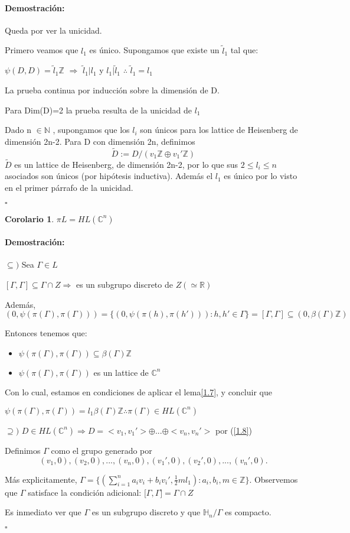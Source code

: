 \documentclass[12pt]{article}
\newtheorem{corollary}{Corolario}
\newenvironment{proof}{\paragraph{Demostración:}}{\hfill$\square$}
\begin{document}
\begin{proof}
Queda por ver la unicidad.

Primero veamos que $l_1$ es único. Supongamos que  existe un $\tilde{l}_1$ tal que: 

$\psi(D,D)=\tilde{l}_1 \mathbb{Z}$ $\Rightarrow$ $\tilde{l}_1 | l_1$ y $l_1 | \tilde{l}_1$ $\therefore$ $\tilde{l}_1=l_1$

La prueba continua por inducción sobre la dimensión de D.

Para Dim(D)=2 la prueba resulta de la unicidad de $l_1$

Dado n $\in \mathbb{N}$ , supongamos que los $l_i$ son únicos para los lattice de Heisenberg de dimensión 2n-2.
Para D con dimensión 2n, definimos
$$\tilde{D}:=D/(v_1 \mathbb{Z} \oplus v_1' \mathbb{Z})$$
$\tilde{D}$ es un lattice de Heisenberg, de dimensión 2n-2, por lo que sus $2\leq l_i\leq n$ asociados son únicos
(por hipótesis inductiva). Además el $l_1$ es único por lo visto en el primer párrafo de la unicidad.

 \end{proof}
 
 \begin{corollary}
  $\pi L = HL(\mathbb{C}^n)$
 \end{corollary}
 \begin{proof}
$\subseteq)$ Sea $\Gamma \in L$

$[\Gamma,\Gamma] \subseteq \Gamma \cap Z \Rightarrow$ es un subgrupo discreto de $Z (\simeq \mathbb{R})$

Además, $(0,\psi(\pi(\Gamma),\pi(\Gamma))) = \{(0,\psi(\pi(h),\pi(h'))): h,h' \in \Gamma\} = [\Gamma,\Gamma] \subseteq (0,\beta(\Gamma) \mathbb{Z})$

Entonces tenemos que:
\begin{itemize}
 \item $\psi(\pi(\Gamma),\pi(\Gamma)) \subseteq \beta(\Gamma) \mathbb{Z}$
 \item $\psi(\pi(\Gamma),\pi(\Gamma))$ es un lattice de $\mathbb{C}^n$
\end{itemize}

Con lo cual, estamos en condiciones de aplicar el lema\ref{1.7}, y concluir que 

$\psi(\pi(\Gamma),\pi(\Gamma))=l_1 \beta(\Gamma) \mathbb{Z} \therefore \pi(\Gamma) \in HL(\mathbb{C}^n) $
\newline

$\supseteq)$ $D\in HL(\mathbb{C}^n) \Rightarrow D=<v_1,v_1'>\oplus ... \oplus <v_n,v_n'>$ por (\ref{1.8}) 

Definimos $\Gamma$  como el grupo generado por
$${(v_1,0),(v_2,0),...,(v_n,0),(v_1',0),(v_2',0),...,(v_n',0)}.$$

Más explicitamente, $\Gamma=\{(\sum_{i=1}^n a_i v_i + b_i v_i', \frac{1}{2} m l_1):a_i,b_i,m \in \mathbb{Z} \}$.
Observemos que $\Gamma$ satisface la condición adicional: ${[}\Gamma,\Gamma{]}= \Gamma \cap Z$

Es inmediato ver que $\Gamma$ es un subgrupo discreto y que $\mathbb{H}_n / \Gamma$ es compacto.

 \end{proof}
\end{document}
